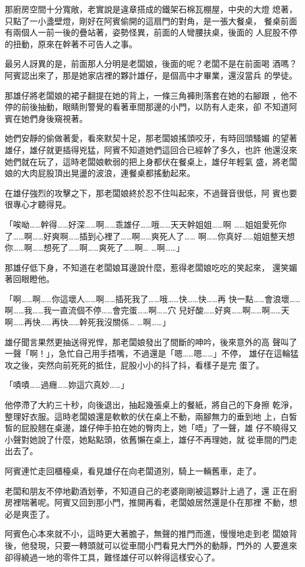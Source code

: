 那廚房空間十分寬敞，老實說是違章搭成的鐵架石棉瓦棚屋，中央的大燈
熄著，只點了一小盞壁燈，剛好在阿賓偷開的這扇門的對角，是一張大餐桌，
餐桌前面有兩個人一前一後的疊站著，姿勢怪異，前面的人彎腰扶桌，後面的
人屁股不停的扭動，原來在幹著不可告人之事。

最另人訝異的是，前面那人分明是老闆娘，後面的呢？老闆不是在前面喝
酒嗎？阿賓認出來了，那是她家店裡的夥計雄仔，是個高中才畢業，還沒當兵
的學徒。

那雄仔將老闆娘的裙子翻提在她的背上，一條三角褲則落套在她的右腳跟
，他不停的前後抽動，眼睛則警覺的看著車間那邊的小門，以防有人走來，卻
不知道阿賓在她們身後窺視著。

她們安靜的偷做著愛，看來默契十足，那老闆娘搖頭咬牙，有時回頭騷媚
的望著雄仔，雄仔就更插得兇猛，阿賓不知道她們這回合已經幹了多久，也許
他還沒來她們就在玩了，這時老闆娘軟弱的把上身都伏在餐桌上，雄仔年輕氣
盛，將老闆娘的大肉屁股頂出晃盪的波浪，連餐桌都搖動起來。

在雄仔強烈的攻擊之下，那老闆娘終於忍不住叫起來，不過聲音很低，阿
賓也要很專心才聽得見。

「唉呦……幹得……好深……啊……乖雄仔……哦……天天幹姐姐……啊
……姐姐愛死你了……啊……好爽啊……插到心裡了……啊……爽死人了……
啊……你真好……姐姐整天想你……啊……想死了……啊……爽死了……啊…
…啊……」

那雄仔低下身，不知道在老闆娘耳邊說什麼，惹得老闆娘吃吃的笑起來，
還笑媚著回眼瞪他。

「啊……啊……你這壞人……啊……插死我了……哦……快……快……再
快一點……會浪壞……啊……我……我一直流個不停……會完蛋……啊……穴
兒好酸……好爽……啊……啊……天啊……再快……再快……幹死我沒關係…
…啊……」

雄仔聞言果然更抽送得兇悍，那老闆娘發出了間斷的呻吟，後來意外的高
聲叫了一聲「啊！」，急忙自己用手捂嘴，不過還是「嗯……嗯……」不停，
雄仔在這輪猛攻之後，突然向前死死的抵住，屁股小小的抖了抖，看樣子是完
蛋了。

「嘖嘖……過癮……妳這穴真妙……」

他停滯了大約三十秒，向後退出，抽起幾張桌上的餐紙，將自己的下身擦
乾淨，整理好衣服。這時老闆娘還是軟軟的伏在桌上不動，兩腳無力的垂到地
上，白皙皙的屁股翹在桌邊，雄仔伸手拍在她的臀肉上，她「唔」了一聲，雄
仔不曉得又小聲對她說了什麼，她點點頭，依舊懶在桌上，雄仔不再理她，就
從車間的門走出去了。

阿賓連忙走回櫃檯桌，看見雄仔在向老闆道別，騎上一輛舊車，走了。

老闆和朋友不停地勸酒划拳，不知道自己的老婆剛剛被這夥計上過了，還
正在廚房裡喘著呢。阿賓又回到那小門，推開再看，老闆娘居然還是仆在那裡
不動，想必是爽歪了。

阿賓色心本來就不小，這時更大著膽子，無聲的推門而進，慢慢地走到老
闆娘背後，他發現，只要一轉頭就可以從車間小門看見大門外的動靜，門外的
人要進來卻得繞過一地的零件工具，難怪雄仔可以幹得這樣安心了。

